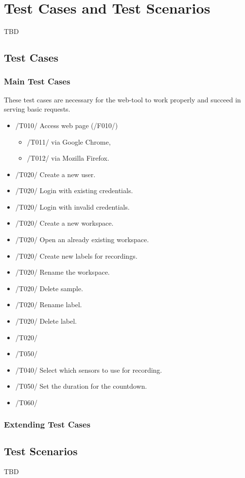 \section{Test Cases and Test Scenarios}
TBD
\subsection{Test Cases}
\subsubsection{Main Test Cases}
These test cases are necessary for the web-tool to work properly and succeed in serving
basic requests.

\begin{itemize}
    \item /T010/ Access web page (/F010/)
    \begin{itemize}
        \item /T011/ via Google Chrome,
        \item /T012/ via Mozilla Firefox.
    \end{itemize}
    \item /T020/ Create a new user.
    \item /T020/ Login with existing credentials.
    \item /T020/ Login with invalid credentials.
    \item /T020/ Create a new workspace.
    \item /T020/ Open an already existing workspace.
    \item /T020/ Create new labels for recordings.
    \item /T020/ Rename the workspace.
    \item /T020/ Delete sample.
    \item /T020/ Rename label.
    \item /T020/ Delete label.
    \item /T020/ 
    \item /T050/ 
    \item /T040/ Select which sensors to use for recording.
    \item /T050/ Set the duration for the countdown.
    \item /T060/ 
\end{itemize}
\subsubsection{Extending Test Cases}
\subsection{Test Scenarios}
TBD